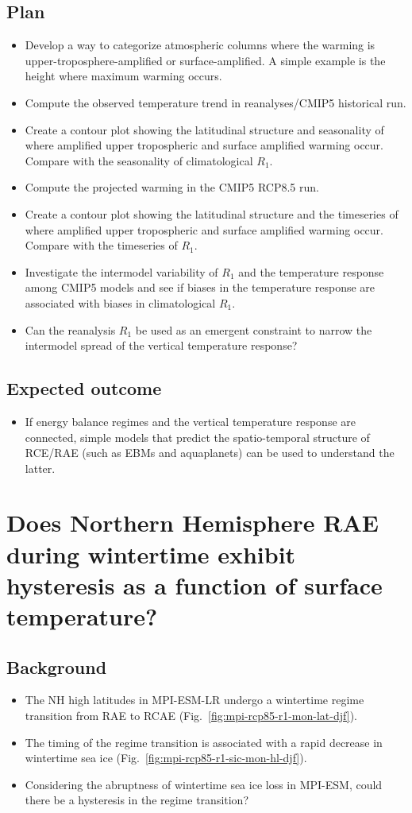 \documentclass{article}
\begin{document}
\subsection{Plan}
\begin{itemize}
	\item Develop a way to categorize atmospheric columns where the warming is upper-troposphere-amplified or surface-amplified. A simple example is the height where maximum warming occurs.
	\item Compute the observed temperature trend in reanalyses/CMIP5 historical run.
	\item Create a contour plot showing the latitudinal structure and seasonality of where amplified upper tropospheric and surface amplified warming occur. Compare with the seasonality of climatological $R_1$.
	\item Compute the projected warming in the CMIP5 RCP8.5 run.
	\item Create a contour plot showing the latitudinal structure and the timeseries of where amplified upper tropospheric and surface amplified warming occur. Compare with the timeseries of $R_1$.
	\item Investigate the intermodel variability of $R_1$ and the temperature response among CMIP5 models and see if biases in the temperature response are associated with biases in climatological $R_1$.
	\item Can the reanalysis $R_1$ be used as an emergent constraint to narrow the intermodel spread of the vertical temperature response?
\end{itemize}
\subsection{Expected outcome}
\begin{itemize}
	\item If energy balance regimes and the vertical temperature response are connected, simple models that predict the spatio-temporal structure of RCE/RAE (such as EBMs and aquaplanets) can be used to understand the latter.
\end{itemize}

\section{Does Northern Hemisphere RAE during wintertime exhibit hysteresis as a function of surface temperature?}
\subsection{Background}
\begin{itemize}
	\item The NH high latitudes in MPI-ESM-LR undergo a wintertime regime transition from RAE to RCAE (Fig.~\ref{fig:mpi-rcp85-r1-mon-lat-djf}).
	\item The timing of the regime transition is associated with a rapid decrease in wintertime sea ice (Fig.~\ref{fig:mpi-rcp85-r1-sic-mon-hl-djf}).
	\item Considering the abruptness of wintertime sea ice loss in MPI-ESM, could there be a hysteresis in the regime transition?
\end{itemize}
\end{document}
